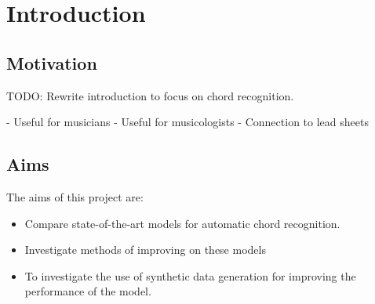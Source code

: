 \chapter{Introduction}

\section{Motivation}




TODO:
Rewrite introduction to focus on chord recognition.

- Useful for musicians
- Useful for musicologists
- Connection to lead sheets

\section{Aims}

The aims of this project are:
\begin{itemize}
    \item Compare state-of-the-art models for automatic chord recognition.
    \item Investigate methods of improving on these models 
    \item To investigate the use of synthetic data generation for improving the performance of the model.
\end{itemize}

